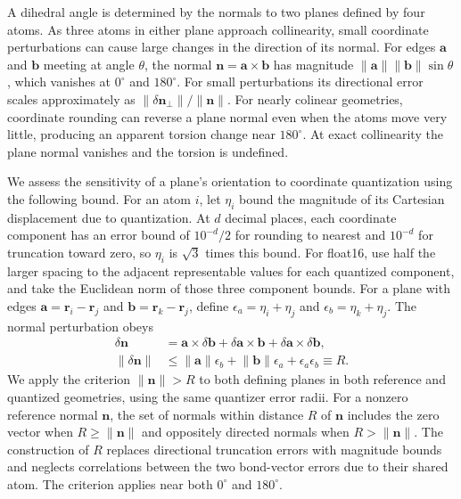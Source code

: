 \documentclass[%
 preprint,
superscriptaddress,
 amsmath,amssymb,
 aip,
 jcp,
]{revtex4-2}
\begin{document}
A dihedral angle is determined by the normals to two planes defined by four atoms.
As three atoms in either plane approach collinearity, small coordinate perturbations can cause large changes in the direction of its normal.
For edges $\mathbf{a}$ and $\mathbf{b}$ meeting at angle $\theta$, the normal $\mathbf{n}=\mathbf{a}\times\mathbf{b}$ has magnitude $\lVert\mathbf{a}\rVert\lVert\mathbf{b}\rVert\sin\theta$, which vanishes at $0^\circ$ and $180^\circ$.
For small perturbations its directional error scales approximately as $\lVert\delta\mathbf{n}_{\perp}\rVert/\lVert\mathbf{n}\rVert$.
For nearly colinear geometries, coordinate rounding can reverse a plane normal even when the atoms move very little, producing an apparent torsion change near $180^\circ$.
At exact collinearity the plane normal vanishes and the torsion is undefined.

We assess the sensitivity of a plane's orientation to coordinate quantization using the following bound.
For an atom $i$, let $\eta_i$ bound the magnitude of its Cartesian displacement due to quantization.
At $d$ decimal places, each coordinate component has an error bound of $10^{-d}/2$ for rounding to nearest and $10^{-d}$ for truncation toward zero, so $\eta_i$ is $\sqrt{3}$ times this bound.
For float16, use half the larger spacing to the adjacent representable values for each quantized component, and take the Euclidean norm of those three component bounds.
For a plane with edges $\mathbf{a}=\mathbf{r}_i-\mathbf{r}_j$ and $\mathbf{b}=\mathbf{r}_k-\mathbf{r}_j$, define $\epsilon_a=\eta_i+\eta_j$ and $\epsilon_b=\eta_k+\eta_j$.
The normal perturbation obeys
\begin{align}
 \delta\mathbf{n} &= \mathbf{a}\times\delta\mathbf{b}
   +\delta\mathbf{a}\times\mathbf{b}+\delta\mathbf{a}\times\delta\mathbf{b},\\
 \lVert\delta\mathbf{n}\rVert &\leq
 \lVert\mathbf{a}\rVert\epsilon_b+
 \lVert\mathbf{b}\rVert\epsilon_a+\epsilon_a\epsilon_b
 \equiv R.
 \label{eq:plane_normal_bound}
\end{align}
We apply the criterion $\lVert\mathbf n\rVert>R$ to both defining planes in both reference and quantized geometries, using the same quantizer error radii.
For a nonzero reference normal $\mathbf n$, the set of normals within distance $R$ of $\mathbf n$ includes the zero vector when $R\geq\lVert\mathbf n\rVert$ and oppositely directed normals when $R>\lVert\mathbf n\rVert$.
The construction of $R$ replaces directional truncation errors with magnitude bounds and neglects correlations between the two bond-vector errors due to their shared atom.
The criterion applies near both $0^\circ$ and $180^\circ$.
\end{document}
